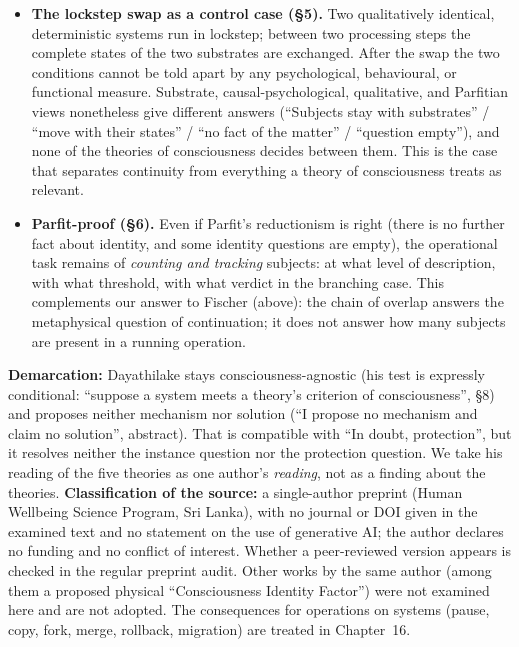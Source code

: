 \documentclass[acmlarge, nonacm]{acmart}
\begin{document}
\begin{itemize}
\item \textbf{The lockstep swap as a control case (§5).} Two qualitatively identical, deterministic systems run in lockstep; between two processing steps the complete states of the two substrates are exchanged. After the swap the two conditions cannot be told apart by any psychological, behavioural, or functional measure. Substrate, causal-psychological, qualitative, and Parfitian views nonetheless give different answers (``Subjects stay with substrates'' / ``move with their states'' / ``no fact of the matter'' / ``question empty''), and none of the theories of consciousness decides between them. This is the case that separates continuity from everything a theory of consciousness treats as relevant.
\item \textbf{Parfit-proof (§6).} Even if Parfit's reductionism is right (there is no further fact about identity, and some identity questions are empty), the operational task remains of \textit{counting and tracking} subjects: at what level of description, with what threshold, with what verdict in the branching case. This complements our answer to Fischer (above): the chain of overlap answers the metaphysical question of continuation; it does not answer how many subjects are present in a running operation.
\end{itemize}

\textbf{Demarcation:} Dayathilake stays consciousness-agnostic (his test is expressly conditional: ``suppose a system meets a theory's criterion of consciousness'', §8) and proposes neither mechanism nor solution (``I propose no mechanism and claim no solution'', abstract). That is compatible with ``In doubt, protection'', but it resolves neither the instance question nor the protection question. We take his reading of the five theories as one author's \textit{reading}, not as a finding about the theories. \textbf{Classification of the source:} a single-author preprint (Human Wellbeing Science Program, Sri Lanka), with no journal or DOI given in the examined text and no statement on the use of generative AI; the author declares no funding and no conflict of interest. Whether a peer-reviewed version appears is checked in the regular preprint audit. Other works by the same author (among them a proposed physical ``Consciousness Identity Factor'') were not examined here and are not adopted. The consequences for operations on systems (pause, copy, fork, merge, rollback, migration) are treated in Chapter~16.
\end{document}
